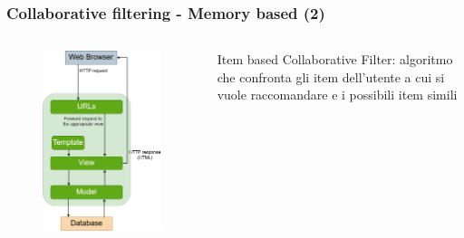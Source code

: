\begin{frame}
    \frametitle{Collaborative filtering - Memory based (2)}
    \begin{columns}
        \begin{column}{0.5\textwidth}
            \begin{figure}
                \centering
                \includegraphics[scale=0.5]{images/IB_CF_ex}
            \end{figure}
        \end{column}
        \begin{column}{0.5\textwidth}
            \alert{Item based Collaborative Filter}: algoritmo che confronta gli item dell'utente a cui si vuole raccomandare e i possibili item simili
        \end{column}
    \end{columns}
\end{frame}

